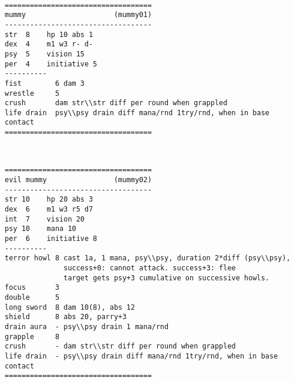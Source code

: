 \

\pagebreak[1]
\tiny \begin{samepage} \begin{verbatim}
===================================
mummy                     (mummy01)
-----------------------------------
str  8    hp 10 abs 1
dex  4    m1 w3 r- d-
psy  5    vision 15
per  4    initiative 5
----------
fist        6 dam 3
wrestle     5
crush       dam str\\str diff per round when grappled
life drain  psy\\psy drain diff mana/rnd 1try/rnd, when in base contact
===================================
\end{verbatim} \end{samepage} \normalsize

\

\pagebreak[1]
\tiny \begin{samepage} \begin{verbatim}
===================================
evil mummy                (mummy02)
-----------------------------------
str 10    hp 20 abs 3
dex  6    m1 w3 r5 d7
int  7    vision 20
psy 10    mana 10
per  6    initiative 8
----------
terror howl 8 cast 1a, 1 mana, psy\\psy, duration 2*diff (psy\\psy),
              success+0: cannot attack. success+3: flee
              target gets psy+3 cumulative on successive howls.
focus       3
double      5
long sword  8 dam 10(8), abs 12
shield      8 abs 20, parry+3
drain aura  - psy\\psy drain 1 mana/rnd
grapple     8
crush       - dam str\\str diff per round when grappled
life drain  - psy\\psy drain diff mana/rnd 1try/rnd, when in base contact
===================================
\end{verbatim} \end{samepage} \normalsize








